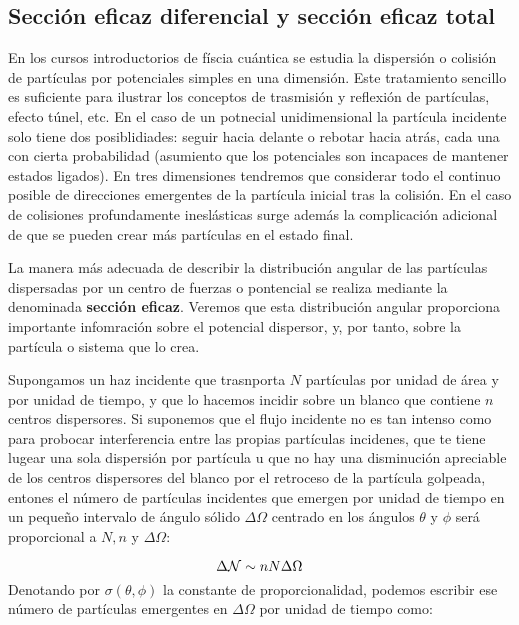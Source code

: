 \subsection{Sección eficaz diferencial y sección eficaz total}

En los cursos introductorios de físcia cuántica se estudia la dispersión o colisión de partículas por potenciales simples en una dimensión. Este tratamiento sencillo es suficiente para ilustrar los conceptos de trasmisión y reflexión de partículas, efecto túnel, etc. En el caso de un potnecial unidimensional la partícula incidente solo tiene dos posiblidiades: seguir hacia delante o rebotar hacia atrás, cada una con cierta probabilidad (asumiento que los potenciales son incapaces de mantener estados ligados). En tres dimensiones tendremos que considerar todo el continuo posible de direcciones emergentes de la partícula inicial tras la colisión. En el caso de colisiones profundamente ineslásticas surge además la complicación adicional de que se pueden crear más partículas en el estado final.

La manera más adecuada de describir la distribución angular de las partículas dispersadas por un centro de fuerzas o pontencial se realiza mediante la denominada \textbf{sección eficaz}. Veremos que esta distribución angular proporciona importante infomración sobre el potencial dispersor, y, por tanto, sobre la partícula o sistema que lo crea.

Supongamos un haz incidente que trasnporta $N$ partículas por unidad de área y por unidad de tiempo, y que lo hacemos incidir sobre un blanco que contiene $n$ centros dispersores. Si suponemos que el flujo incidente no es tan intenso como para probocar interferencia entre las propias partículas incidenes, que te tiene lugear una sola dispersión por partícula u que no hay una disminución apreciable de los centros dispersores del blanco por el retroceso de la partícula golpeada, entones el número de partículas incidentes que emergen por unidad de tiempo en un pequeño intervalo de ángulo sólido $\Delta \Omega$ centrado en los ángulos $\theta$ y $\phi$ será proporcional a $N,n$ y $\Delta \Omega$:

\begin{equation}
    \Delta \mathcal{N} \sim n N \Delta \Omega
\end{equation}
Denotando por $\sigma (\theta, \phi)$ la constante de proporcionalidad, podemos escribir ese número de partículas emergentes en $\Delta \Omega$ por unidad de tiempo como:

